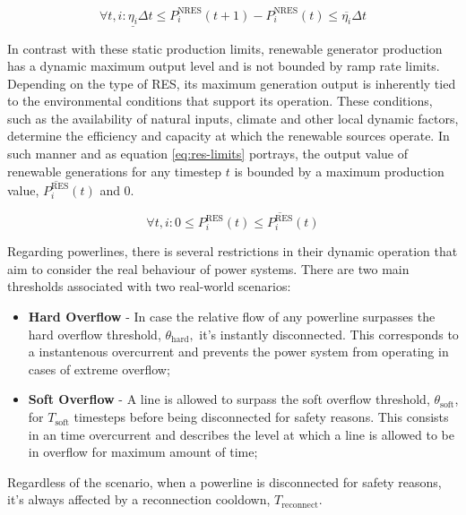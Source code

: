 \begin{equation} \label{eq:ramp-limits}
	\forall t, i: \underline{\eta_i } \Delta t \leq P^\text{NRES}_i (t + 1) - P^\text{NRES}_i (t) \leq \overline{\eta_i} \Delta t
\end{equation}

In contrast with these static production limits, renewable generator production has a dynamic maximum output level and is not bounded by ramp rate limits. Depending on the type of \ac{RES}, its maximum generation output is inherently tied to the environmental conditions that support its operation. These conditions, such as the availability of natural inputs, climate and other local dynamic factors, determine the efficiency and capacity at which the renewable sources operate. In such manner and as equation \ref{eq:res-limits} portrays, the output value of renewable generations for any timestep $t$ is bounded by a maximum production value, $\overline{P^\text{RES}_i} (t)$ and 0.

\begin{equation} \label{eq:res-limits}
	\forall t, i: 0 \leq P^\text{RES}_i (t) \leq \overline{P^\text{RES}_i} (t)
\end{equation}

Regarding powerlines, there is several restrictions in their dynamic operation that aim to consider the real behaviour of power systems. There are two main thresholds associated with two real-world scenarios:

\begin{itemize}
	\item \textbf{Hard Overflow} - In case the relative flow of any powerline surpasses the hard overflow threshold, $\theta_\text{hard},$ it's instantly disconnected. This corresponds to a instantenous overcurrent and prevents the power system from operating in cases of extreme overflow;
	\item \textbf{Soft Overflow} - A line is allowed to surpass the soft overflow threshold, $\theta_\text{soft}$, for $T_\text{soft}$ timesteps before being disconnected for safety reasons. This consists in an time overcurrent and describes the level at which a line is allowed to be in overflow for maximum amount of time;
\end{itemize}
Regardless of the scenario, when a powerline is disconnected for safety reasons, it's always affected by a reconnection cooldown, $T_\text{reconnect}$.

